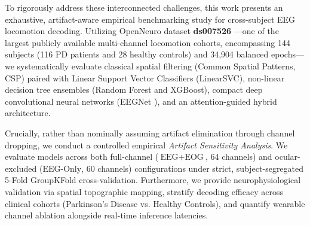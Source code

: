 \documentclass[review,12pt]{elsarticle}
\begin{document}
To rigorously address these interconnected challenges, this work presents an exhaustive, artifact-aware empirical benchmarking study for cross-subject EEG locomotion decoding. Utilizing OpenNeuro dataset \textbf{ds007526} \cite{orban2024dataset}---one of the largest publicly available multi-channel locomotion cohorts, encompassing 144 subjects (116 PD patients and 28 healthy controls) and 34,904 balanced epochs---we systematically evaluate classical spatial filtering (Common Spatial Patterns, CSP) paired with Linear Support Vector Classifiers (LinearSVC), non-linear decision tree ensembles (Random Forest and XGBoost), compact deep convolutional neural networks (EEGNet \cite{lawhern2018eegnet}), and an attention-guided hybrid architecture.

Crucially, rather than nominally assuming artifact elimination through channel dropping, we conduct a controlled empirical \textit{Artifact Sensitivity Analysis}. We evaluate models across both full-channel ($\text{EEG}+\text{EOG}$, 64 channels) and ocular-excluded ($\text{EEG-Only}$, 60 channels) configurations under strict, subject-segregated 5-Fold GroupKFold cross-validation. Furthermore, we provide neurophysiological validation via spatial topographic mapping, stratify decoding efficacy across clinical cohorts (Parkinson's Disease vs. Healthy Controls), and quantify wearable channel ablation alongside real-time inference latencies.
\end{document}
